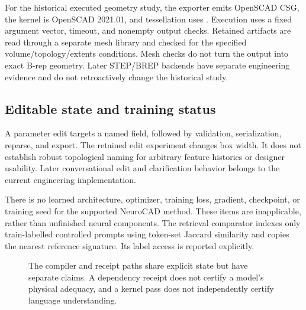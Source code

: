 \documentclass[10pt]{article}
\newcommand{\code}[1]{\texttt{\detokenize{#1}}}
\begin{document}
For the historical executed geometry study, the exporter emits OpenSCAD CSG,
the kernel is OpenSCAD 2021.01, and tessellation uses \code{$fn=48}.
Execution uses a fixed argument vector, timeout, and nonempty output checks.
Retained artifacts are read through a separate mesh library and checked for
the specified volume/topology/extents conditions. Mesh checks do not turn the
output into exact B-rep geometry. Later STEP/BREP backends have separate
engineering evidence and do not retroactively change the historical study.

\subsection{Editable state and training status}

A parameter edit targets a named field, followed by validation, serialization,
reparse, and export. The retained edit experiment changes box width. It does
not establish robust topological naming for arbitrary feature histories or
designer usability. Later conversational edit and clarification behavior
belongs to the current engineering implementation.

There is no learned architecture, optimizer, training loss, gradient,
checkpoint, or training seed for the supported NeuroCAD method. These items
are inapplicable, rather than unfinished neural components. The retrieval
comparator indexes only train-labelled controlled prompts using token-set
Jaccard similarity and copies the nearest reference signature. Its label
access is reported explicitly.

\begin{figure}[t]
\centering
{}
\caption{The compiler and receipt paths share explicit state but have separate
claims. A dependency receipt does not certify a model's physical adequacy,
and a kernel pass does not independently certify language understanding.}
\label{fig:architecture}
\end{figure}
\end{document}
